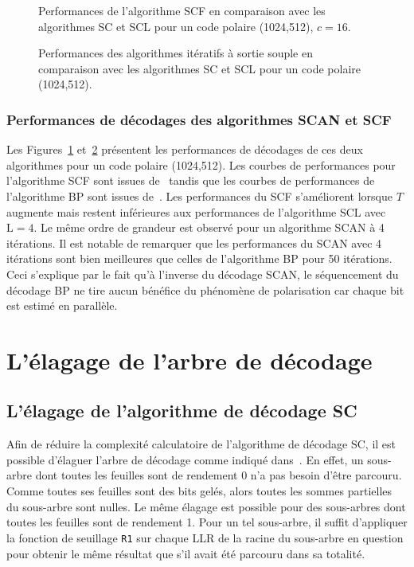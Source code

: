 \begin{figure}[h]
  \centering
  
  \caption{Performances de l'algorithme SCF en comparaison avec les algorithmes SC et SCL pour un code polaire (1024,512), $c=16$.}
  \label{fig:scf}
\end{figure}
\begin{figure}[h]
  \centering
  
  \caption{Performances des algorithmes itératifs à sortie souple en comparaison avec les algorithmes SC et SCL pour un code polaire (1024,512).}
  \label{fig:bp_scan}
\end{figure}
\subsubsection{Performances de décodages des algorithmes SCAN et SCF}
Les Figures~\ref{fig:scf} et~\ref{fig:bp_scan} présentent les performances de décodages de ces deux algorithmes pour un code polaire (1024,512). Les courbes de performances pour l'algorithme SCF sont issues de~\cite{afisiadis_low-complexity_2014} tandis que les courbes de performances de l'algorithme BP sont issues de~\cite{pamuk_fpga_2011}. Les performances du SCF s'améliorent lorsque $T$ augmente mais restent inférieures aux performances de l'algorithme SCL avec $\mathrm{L}=4$. Le même ordre de grandeur est observé pour un algorithme SCAN à 4 itérations. Il est notable de remarquer que les performances du SCAN avec 4 itérations sont bien meilleures que celles de l'algorithme BP pour 50 itérations. Ceci s'explique par le fait qu'à l'inverse du décodage SCAN, le séquencement du décodage BP ne tire aucun bénéfice du phénomène de polarisation car chaque bit est estimé en parallèle.

\section{L'élagage de l'arbre de décodage}


\subsection{L'élagage de l'algorithme de décodage SC}
Afin de réduire la complexité calculatoire de l'algorithme de décodage SC, il est possible d'élaguer l'arbre de décodage comme indiqué dans~\cite{alamdar-yazdi_simplified_2011}. En effet, un sous-arbre dont toutes les feuilles sont de rendement 0 n'a pas besoin d'être parcouru. Comme toutes ses feuilles sont des bits gelés, alors toutes les sommes partielles du sous-arbre sont nulles. Le même élagage est possible pour des sous-arbres dont toutes les feuilles sont de rendement 1. Pour un tel sous-arbre, il suffit d'appliquer la fonction de seuillage \texttt{R1} sur chaque LLR de la racine du sous-arbre en question pour obtenir le même résultat que s'il avait été parcouru dans sa totalité.


